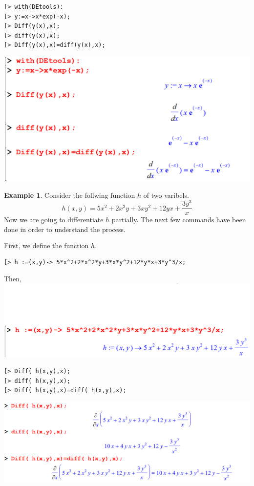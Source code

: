 \documentclass[
]{book}
\theoremstyle{definition}
\theoremstyle{definition}
\newtheorem{example}{Example}[chapter]
\theoremstyle{definition}
\theoremstyle{definition}
\theoremstyle{remark}
\begin{document}
\begin{verbatim}
[> with(DEtools):
[> y:=x->x*exp(-x);
[> Diff(y(x),x);
[> diff(y(x),x);
[> Diff(y(x),x)=diff(y(x),x);
\end{verbatim}

\includegraphics{figures/Diff/Diff 6.1 -1.png}

\begin{example}
\protect\hypertarget{exm:unnamed-chunk-41}{}\label{exm:unnamed-chunk-41}Consider the follwing function \(h\) of two varibels.
\[h(x,y)=5x^2 + 2x^2y + 3xy^2 + 12yx + \frac{3y^3}{x}\]
Now we are going to differentiate \(h\) partially. The next few
commands have been done in order to understand the process.
\end{example}

First, we define the function \(h\).

\begin{verbatim}
[> h :=(x,y)-> 5*x^2+2*x^2*y+3*x*y^2+12*y*x+3*y^3/x;
\end{verbatim}

Then,
\includegraphics{figures/Diff/Diff 6.1 -2.png}

\begin{verbatim}
[> Diff( h(x,y),x);
[> diff( h(x,y),x);
[> Diff( h(x,y),x)=diff( h(x,y),x);
\end{verbatim}

\includegraphics{figures/Diff/Diff 6.1 -3.png}
\end{document}
